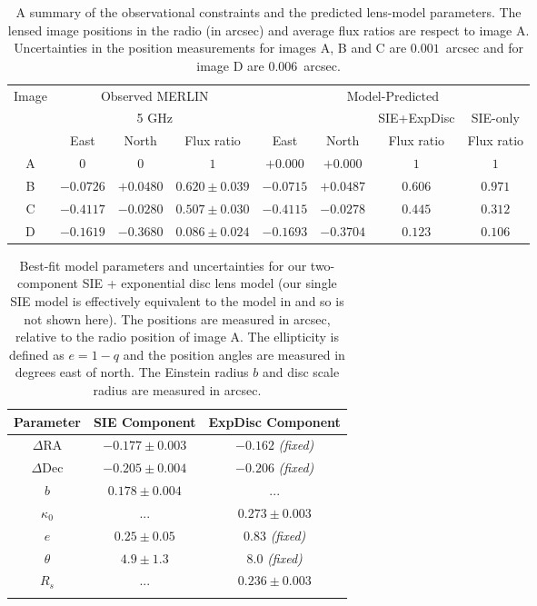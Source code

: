 \documentclass[a4paper,fleqn,usenatbib,useAMS]{mnras}
\begin{document}
\begin{table}
\centering
\caption{A summary of the observational constraints and the predicted lens-model parameters. The lensed image positions in the radio \citep{Marlow99} (in arcsec) and average flux ratios \citep{K03} are respect to image A. Uncertainties in the position measurements for images A, B and C are $0.001$~arcsec and for image D are $0.006$~arcsec.}
\begin{tabular}{cccccccc}
\hline
Image	&\multicolumn{3}{c}{Observed MERLIN} 	 	& \multicolumn{4}{c}{Model-Predicted}\\
		&\multicolumn{3}{c}{5 GHz}		& & & {SIE+ExpDisc} & SIE-only\\
		&East &North & Flux ratio &East 	&North & Flux ratio &Flux ratio\\ 
\hline
A  &$0$    		&$0$			&  $1$ 				&$+0.000$  &$+0.000$	& $1$ 		& $1$\\  
B  &$-0.0726$	&$+0.0480$	& $0.620 \pm 0.039$ 	&$-0.0715$ &$+0.0487$		& $0.606$ 	& $0.971$ \\  
C  &$-0.4117$ 	&$-0.0280$	& $0.507\pm 0.030$	&$-0.4115$ &$-0.0278$		& $0.445$ 	& $0.312$\\  
D  &$-0.1619$	&$-0.3680$	& $0.086 \pm 0.024$ 	&$-0.1693$ &$-0.3704$		& $0.123$ 	& $0.106$\\  
\hline
\end{tabular}
\label{tab:results}
\end{table}

\begin{table}
\centering
\caption{Best-fit model parameters and uncertainties for our two-component SIE + exponential disc lens model (our single SIE model is effectively equivalent to the model in \citet{Marlow99} and so is not shown here). The positions are measured in arcsec, relative to the radio position of image A. The ellipticity is defined as $e=1-q$ and the position angles are measured in degrees east of north. The Einstein radius $b$ and disc scale radius are measured in arcsec.}
\begin{tabular}{ccc}
\hline 
Parameter    & SIE Component & ExpDisc Component  \\
\hline
$\Delta$RA	& $-0.177 \pm 0.003$		& $-0.162$ \textit{(fixed)}\\
$\Delta$Dec	& $-0.205 \pm 0.004$		& $-0.206$ \textit{(fixed)} \\
$b$ 			& $0.178 \pm 0.004$  		& ...  \\
$\kappa_0$ & ... &$0.273 \pm 0.003$\\
$e$	  		& $0.25 \pm 0.05$			& $0.83$ \textit{(fixed)} \\
$\theta$ 		& $4.9 \pm 1.3$			& $8.0$ \textit{(fixed)}	 \\
$R_s$			& ...  						& $0.236 \pm 0.003$	 \\
\hline
\label{tab:model}
\end{tabular}
\end{table}
\end{document}
